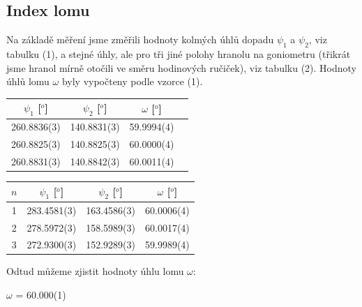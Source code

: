 \documentclass[a4paper,11pt]{article}
\begin{document}
\begin{minipage}[t]{0.5\textwidth}
        \subsection{Index lomu}
            Na základě měření jsme změřili hodnoty kolmých úhlů dopadu $\psi_1$ a $\psi_2$, viz tabulku (1), a stejné úhly, ale pro tři jiné polohy hranolu na goniometru (třikrát jsme hranol mírně otočili ve směru hodinových ručiček), viz tabulku (2). Hodnoty úhlů lomu $\omega$ byly vypočteny podle vzorce (1).
            \vspace{10pt}
            \par \centering
            \begin{tabular}{|c|c|c|c|}
                    \hline
                    $\psi_1$ [$^o$] & $\psi_2$ [$^o$] & $\omega$ [$^o$] \\
                    \hline
                    260.8836(3) & 140.8831(3) & 59.9994(4) \\
                    \hline
                    260.8825(3) & 140.8825(3) & 60.0000(4) \\
                    \hline
                    260.8831(3) & 140.8842(3) & 60.0011(4) \\
                    \hline
                \end{tabular}
                \captionsetup{justification=centering, font=footnotesize}
                \raggedright
            \vspace{5pt}
            \par \centering
            \begin{tabular}{|c|c|c|c|}
                    \hline
                    $n$ & $\psi_1$ [$^o$] & $\psi_2$ [$^o$] & $\omega$ [$^o$] \\
                    \hline
                    1 & 283.4581(3) & 163.4586(3) & 60.0006(4) \\
                    \hline
                    2 & 278.5972(3) & 158.5989(3) & 60.0017(4) \\
                    \hline
                    3 & 272.9300(3) & 152.9289(3) & 59.9989(4) \\
                    \hline
                \end{tabular}
                \captionsetup{justification=centering, font=footnotesize}
                \vspace{20pt}
                \raggedright
                \par Odtud můžeme zjistit hodnoty úhlu lomu $\omega$: 
                \begin{center}
                    $\omega$ = 60.000(1) 
                \end{center}

\end{minipage}
\end{document}
